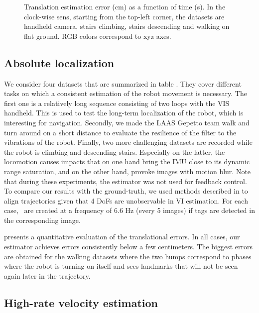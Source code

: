 \begin{figure}[t]
\begin{subfigure}{0.5\textwidth}
     \end{subfigure}%
    \caption{Translation estimation error (cm) as a function of time (s). In the clock-wise sens, starting from the 
             top-left corner, the datasets are handheld camera, stairs climbing, stairs descending and walking on flat ground. 
             RGB colors correspond to xyz axes.}
    \label{fig:results}
\end{figure}


\subsection{Absolute localization}

We consider four datasets that are summarized in table . They cover different tasks on which a consistent 
estimation of the robot movement is necessary. The first one is a relatively long sequence consisting of two loops with the VIS handheld. 
This is used to test the long-term localization of the robot, which is interesting for navigation. Secondly, we made the LAAS Gepetto team 
 walk and turn around on a short distance to evaluate the resilience of the filter to the vibrations of the robot. Finally, two more 
challenging datasets are recorded while the robot is climbing and descending stairs. Especially on the latter, the locomotion causes impacts 
that on one hand bring the IMU close to its dynamic range saturation, and on the other hand, provoke images with motion blur. Note that during these experiments, 
the estimator was not used for feedback control. To compare our results with the ground-truth, we used methods described in \cite{zhang2018tutorial} to align 
trajectories given that 4 DoFs are unobservable in VI estimation.
For each case, \keyframes\ are created at a frequency of 6.6 Hz (every 5 images) if tags are detected in the corresponding image.


 presents a quantitative evaluation of the translational errors. In all cases, our estimator achieves errors consistently below a few centimeters. 
The biggest errors are obtained for the walking datasets where the two humps correspond to phases where the robot is turning on itself and sees landmarks that will not be 
seen again later in the trajectory.

\subsection{High-rate velocity estimation}

